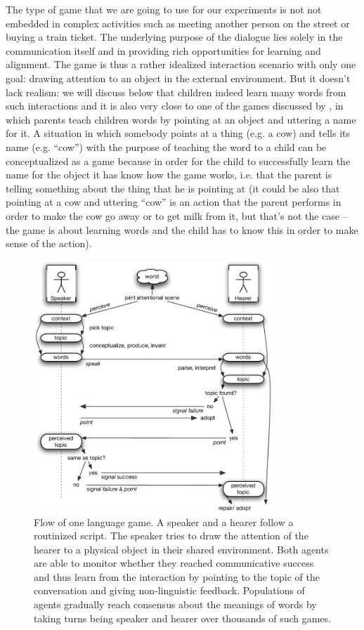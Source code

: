 The type of game that we are going to use for our experiments is not
not embedded in complex activities such as meeting another person on
the street or buying a train ticket. The underlying purpose of the
dialogue lies solely in the communication itself and in providing rich
opportunities for learning and alignment. The game is thus a rather
idealized interaction scenario with only one goal: drawing attention
to an object in the external environment. But it doesn't lack realism:
we will discuss below that children indeed learn many words from such
interactions and it is also very close to one of the games discussed
by \cite{wittgenstein67philosophische}, in which parents teach
children words by pointing at an object and uttering a name for it. A
situation in which somebody points at a thing (e.g. a cow) and tells
its name (e.g. ``cow'') with the purpose of teaching the word to a
child can be conceptualized as a game because in order for the child
to successfully learn the name for the object it has know how the game
works, i.e. that the parent is telling something about the thing that
he is pointing at (it could be also that pointing at a cow and
uttering ``cow'' is an action that the parent performs in order to
make the cow go away or to get milk from it, but that's not the case
-- the game is about learning words and the child has to know this in
order to make sense of the action).

\begin{figure}[t!]
  \centerline{\includegraphics[width=0.80\textwidth]{figures/guessing-game-flow}}
  \caption{Flow of one language game. A speaker and a hearer follow a
    routinized script. The speaker tries to draw the attention of the
    hearer to a physical object in their shared environment.  Both
    agents are able to monitor whether they reached communicative
    success and thus learn from the interaction by pointing to the
    topic of the conversation and giving non-linguistic feedback.
    Populations of agents gradually reach consensus about the meanings
    of words by taking turns being speaker and hearer over thousands
    of such games. }
  \label{f:guessing-game-flow}
\end{figure}


